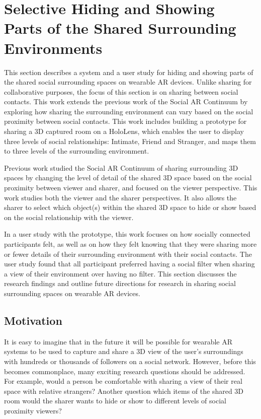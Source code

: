 \section{Selective Hiding and Showing Parts of the Shared Surrounding Environments}
\label{sec:surrounding:hiding}

This section describes a system and a user study for hiding and showing parts of the shared social surrounding spaces on wearable AR devices. Unlike sharing for collaborative purposes, the focus of this section is on sharing between social contacts. This work extends the previous work of the Social AR Continuum by exploring how sharing the surrounding environment can vary based on the social proximity between social contacts. This work includes building a prototype for sharing a 3D captured room on a HoloLens, which enables the user to display three levels of social relationships: Intimate, Friend and Stranger, and maps them to three levels of the surrounding environment.

Previous work studied the Social AR Continuum of sharing surrounding 3D spaces by changing the level of detail of the shared 3D space based on the social proximity between viewer and sharer, and focused on the viewer perspective. This work studies both the viewer and the sharer perspectives. It also allows the sharer to select which object(s) within the shared 3D space to hide or show based on the social relationship with the viewer. 

In a user study with the prototype, this work focuses on how socially connected participants felt, as well as on how they felt knowing that they were sharing more or fewer details of their surrounding environment with their social contacts. The user study found that all participant preferred having a social filter when sharing a view of their environment over having no filter. This section discusses the research findings and outline future directions for research in sharing social surrounding spaces on wearable AR devices. 

\subsection{Motivation}

It is easy to imagine that in the future it will be possible for wearable AR systems to be used to capture and share a 3D view of the user's surroundings with hundreds or thousands of followers on a social network. However, before this becomes commonplace, many exciting research questions should be addressed. For example, would a person be comfortable with sharing a view of their real space with relative strangers? Another question which items of the shared 3D room would the sharer wants to hide or show to different levels of social proximity viewers?

